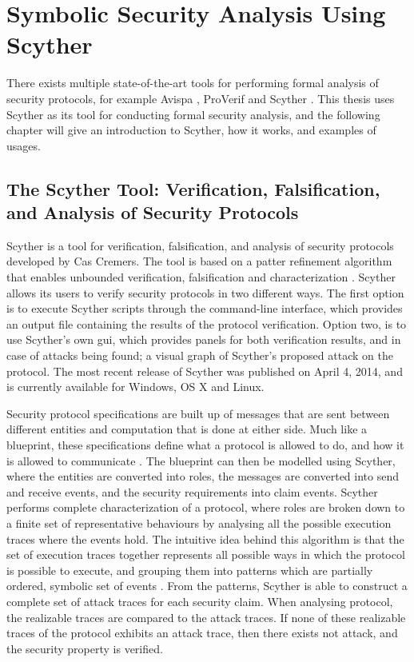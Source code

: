 \chapter{Symbolic Security Analysis Using Scyther}
\label{chp:scyther} 


There exists multiple state-of-the-art tools for performing formal analysis of security protocols, for example Avispa \cite{avispa}, ProVerif \cite{proverif} and Scyther \cite{scyther}. This thesis uses Scyther as its tool for conducting formal security analysis, and the following chapter will give an introduction to Scyther, how it works, and examples of usages.


\section{The Scyther Tool: Verification, Falsification, and Analysis of Security Protocols}

Scyther is a tool for verification, falsification, and analysis of security protocols developed by Cas Cremers. The tool is based on a patter refinement algorithm that enables unbounded verification, falsification and characterization \cite{cremers2008scyther}. Scyther allows its users to verify security protocols in two different ways. The first option is to execute Scyther scripts through the command-line interface, which provides an output file containing the results of the protocol verification. Option two, is to use Scyther's own \gls{gui}, which provides panels for both verification results, and in case of attacks being found; a visual graph of Scyther's proposed attack on the protocol. The most recent release of Scyther was published on April 4, 2014, and is currently available for Windows, OS X and Linux.


Security protocol specifications are built up of messages that are sent between different entities and computation that is done at either side. Much like a blueprint, these specifications define what a protocol is allowed to do, and how it is allowed to communicate \cite{cremers2003defining}. The blueprint can then be modelled using Scyther, where the entities are converted into roles, the messages are converted into send and receive events, and the security requirements into claim events. Scyther performs complete characterization of a protocol, where roles are broken down to a finite set of representative behaviours by analysing all the possible execution traces where the events hold. The intuitive idea behind this algorithm is that the set of execution traces together represents all possible ways in which the protocol is possible to execute, and grouping them into patterns which are partially ordered, symbolic set of events  \cite{cremers2006scyther}. From the patterns, Scyther is able to construct a complete set of attack traces for each security claim. When analysing protocol, the realizable traces are compared to the attack traces. If none of these realizable traces of the protocol exhibits an attack trace, then there exists not attack, and the security property is verified. 

